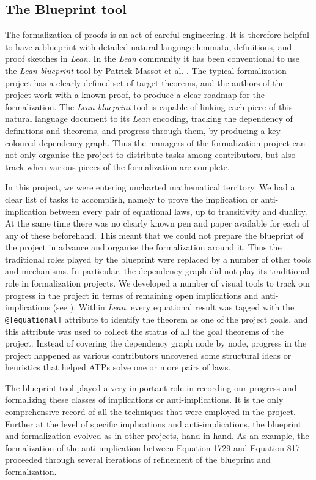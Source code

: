 \subsection{The Blueprint tool}

The formalization of proofs is an act of careful engineering. It is therefore helpful to  have a blueprint with detailed natural language lemmata, definitions, and proof sketches in \emph{Lean}. In the \emph{Lean} community it has been conventional to use the  \emph{Lean blueprint} tool by Patrick Massot et al. \cite{GitHubGitHubPatrickMassotleanblueprint}. The typical formalization project has a clearly defined set of target theorems, and the authors of the project work with a known proof, to produce a clear roadmap for the formalization. The \emph{Lean blueprint} tool is capable of linking each piece of this natural language document to its \emph{Lean} encoding, tracking the dependency of definitions and theorems, and progress through them, by producing a key coloured dependency graph. Thus the managers of the formalization project can not only organise the project to distribute tasks among contributors, but also track when various pieces of the formalization are complete.

In this project, we were entering uncharted mathematical territory. We had a clear list of tasks to accomplish, namely to prove the implication or anti-implication between every pair of equational laws, up to transitivity and duality. At the same time there was no clearly known pen and paper available for each of any of these beforehand. This meant that we could not prepare the blueprint of the project in advance and organise the formalization around it. Thus the traditional roles played by the blueprint were replaced by a number of other tools and mechanisms. In particular, the dependency graph did not play its traditional role in formalization projects. We developed a number of visual tools to track our progress in the project  in terms of remaining open implications and anti-implications (see ). Within \emph{Lean}, every equational result was tagged with the \texttt{@[equational]} attribute to identify the theorem as one of the project goals, and this attribute was used to collect the status of all the goal theorems of the project. Instead of covering the dependency graph node by node, progress in the project happened as various contributors uncovered some structural ideas or heuristics that helped ATPs solve one or more pairs of laws.

The blueprint tool played a very important role in recording our progress and formalizing these classes of implications or anti-implications. It is the only comprehensive record of all the techniques that were employed in the project. Further at the level of specific implications and anti-implications, the blueprint and formalization evolved as in other projects, hand in hand. As an example, the formalization of the anti-implication between Equation 1729 and Equation 817 proceeded through several iterations of refinement of the blueprint and formalization.

